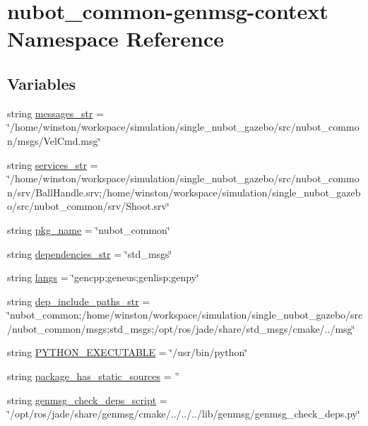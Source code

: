 \hypertarget{namespacenubot__common-genmsg-context}{\section{nubot\-\_\-common-\/genmsg-\/context Namespace Reference}
\label{namespacenubot__common-genmsg-context}
}
\subsection*{Variables}
\begin{DoxyCompactItemize}
\item 
string \hyperlink{namespacenubot__common-genmsg-context_a9d82d20e4ffa677c598751d6630dc734}{messages\-\_\-str} = \char`\"{}/home/winston/workspace/simulation/single\-\_\-nubot\-\_\-gazebo/src/nubot\-\_\-common/msgs/Vel\-Cmd.\-msg\char`\"{}
\item 
string \hyperlink{namespacenubot__common-genmsg-context_a1e2a824c1778c805a4593863a72ba35e}{services\-\_\-str} = \char`\"{}/home/winston/workspace/simulation/single\-\_\-nubot\-\_\-gazebo/src/nubot\-\_\-common/srv/Ball\-Handle.\-srv;/home/winston/workspace/simulation/single\-\_\-nubot\-\_\-gazebo/src/nubot\-\_\-common/srv/Shoot.\-srv\char`\"{}
\item 
string \hyperlink{namespacenubot__common-genmsg-context_aa7e82af182943505146665259b8e1ce9}{pkg\-\_\-name} = \char`\"{}nubot\-\_\-common\char`\"{}
\item 
string \hyperlink{namespacenubot__common-genmsg-context_acb3057b57eb9458421378baa13f383d0}{dependencies\-\_\-str} = \char`\"{}std\-\_\-msgs\char`\"{}
\item 
string \hyperlink{namespacenubot__common-genmsg-context_ad47fe39b5ca574c609a0a44451d67ebe}{langs} = \char`\"{}gencpp;geneus;genlisp;genpy\char`\"{}
\item 
string \hyperlink{namespacenubot__common-genmsg-context_a3cb8468ce84e82ac5e2b66290f260f4c}{dep\-\_\-include\-\_\-paths\-\_\-str} = \char`\"{}nubot\-\_\-common;/home/winston/workspace/simulation/single\-\_\-nubot\-\_\-gazebo/src/nubot\-\_\-common/msgs;std\-\_\-msgs;/opt/ros/jade/share/std\-\_\-msgs/cmake/../msg\char`\"{}
\item 
string \hyperlink{namespacenubot__common-genmsg-context_a07f30a33447f3b83a20605f1732e2763}{P\-Y\-T\-H\-O\-N\-\_\-\-E\-X\-E\-C\-U\-T\-A\-B\-L\-E} = \char`\"{}/usr/bin/python\char`\"{}
\item 
string \hyperlink{namespacenubot__common-genmsg-context_a9b23bed4614ce829e09eb98736bbcfb6}{package\-\_\-has\-\_\-static\-\_\-sources} = ''
\item 
string \hyperlink{namespacenubot__common-genmsg-context_a32a0523eb31dd66d816b3d32bd6aa2b5}{genmsg\-\_\-check\-\_\-deps\-\_\-script} = \char`\"{}/opt/ros/jade/share/genmsg/cmake/../../../lib/genmsg/genmsg\-\_\-check\-\_\-deps.\-py\char`\"{}
\end{DoxyCompactItemize}


